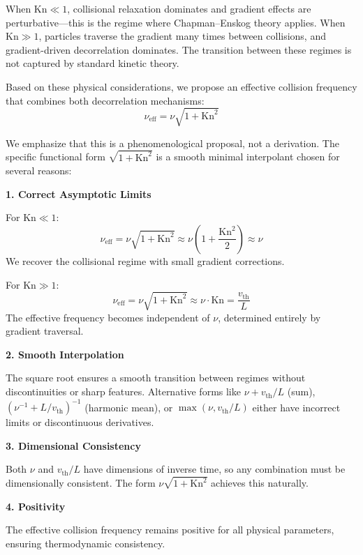 \documentclass[12pt,a4paper]{article}
\newcommand{\Kn}{\text{Kn}}
\newcommand{\eff}{\text{eff}}
\begin{document}
When $\Kn \ll 1$, collisional relaxation dominates and gradient effects are perturbative—this is the regime where Chapman--Enskog theory applies. When $\Kn \gg 1$, particles traverse the gradient many times between collisions, and gradient-driven decorrelation dominates. The transition between these regimes is not captured by standard kinetic theory.

Based on these physical considerations, we propose an effective collision frequency that combines both decorrelation mechanisms:
\begin{equation}
\boxed{\nu_{\eff} = \nu\sqrt{1 + \Kn^2}}
\label{eq:nu_eff}
\end{equation}

We emphasize that this is a phenomenological proposal, not a derivation. The specific functional form $\sqrt{1 + \Kn^2}$ is a smooth minimal interpolant chosen for several reasons:

\textbf{1. Correct Asymptotic Limits}

For $\Kn \ll 1$: 
\begin{equation}
\nu_{\eff} = \nu\sqrt{1 + \Kn^2} \approx \nu\left(1 + \frac{\Kn^2}{2}\right) \approx \nu
\label{eq:nu_eff_collisional}
\end{equation}
We recover the collisional regime with small gradient corrections.

For $\Kn \gg 1$:
\begin{equation}
\nu_{\eff} = \nu\sqrt{1 + \Kn^2} \approx \nu \cdot \Kn = \frac{v_{\text{th}}}{L}
\label{eq:nu_eff_collisionless}
\end{equation}
The effective frequency becomes independent of $\nu$, determined entirely by gradient traversal.

\textbf{2. Smooth Interpolation}

The square root ensures a smooth transition between regimes without discontinuities or sharp features. Alternative forms like $\nu + v_{\text{th}}/L$ (sum), $(\nu^{-1} + L/v_{\text{th}})^{-1}$ (harmonic mean), or $\max(\nu, v_{\text{th}}/L)$ either have incorrect limits or discontinuous derivatives.

\textbf{3. Dimensional Consistency}

Both $\nu$ and $v_{\text{th}}/L$ have dimensions of inverse time, so any combination must be dimensionally consistent. The form $\nu\sqrt{1 + \Kn^2}$ achieves this naturally.

\textbf{4. Positivity}

The effective collision frequency remains positive for all physical parameters, ensuring thermodynamic consistency.
\end{document}
